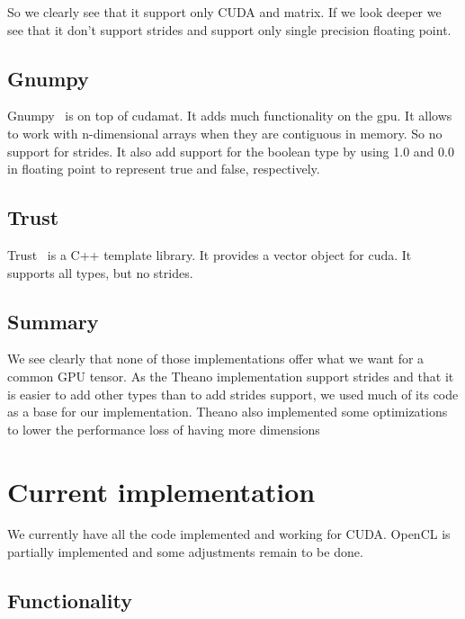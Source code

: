 \documentclass{article} %
\begin{document}
So we clearly see that it support only CUDA and matrix. If we look deeper we see that it don't support strides and support only single precision floating point.

\subsection{Gnumpy}
Gnumpy~\citep{gnumpy-TR2010} is on top of cudamat. It adds much functionality on the gpu. It allows to work with n-dimensional arrays when they are contiguous in memory. So no support for strides. It also add support for the boolean type by using 1.0 and 0.0 in floating point to represent true and false, respectively.

\subsection{Trust}
Trust~\citep{Thrust} is a C++ template library. It provides a vector object for cuda. It supports all types, but no strides.

\subsection{Summary}
We see clearly that none of those implementations offer what we want for a common GPU tensor. As the Theano implementation support strides and that it is easier to add other types than to add strides support, we used much of its code as a base for our implementation. Theano also implemented some optimizations to lower the performance loss of having more dimensions

\section{Current implementation}

We currently have all the code implemented and working for CUDA.  
OpenCL is partially implemented and some adjustments remain to be done.  

\subsection{Functionality}
\end{document}
